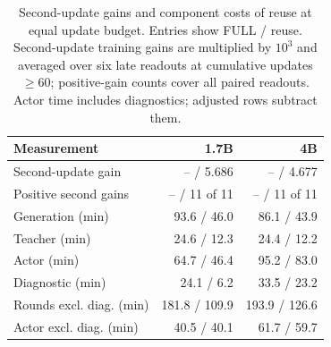 \begin{table}[!htbp]
\centering
\caption{Second-update gains and component costs of reuse at equal update budget. Entries show FULL / reuse. Second-update training gains are multiplied by $10^3$ and averaged over six late readouts at cumulative updates $\geq60$; positive-gain counts cover all paired readouts. Actor time includes diagnostics; adjusted rows subtract them.}
\label{tab:reuse_summary}
\small
\setlength{\tabcolsep}{3pt}
\begin{tabular}{lrr}
\toprule
Measurement & 1.7B & 4B \\
\midrule
Second-update gain & -- / 5.686 & -- / 4.677 \\
Positive second gains & -- / 11 of 11 & -- / 11 of 11 \\
\midrule
Generation (min) & 93.6 / 46.0 & 86.1 / 43.9 \\
Teacher (min) & 24.6 / 12.3 & 24.4 / 12.2 \\
Actor (min) & 64.7 / 46.4 & 95.2 / 83.0 \\
Diagnostic (min) & 24.1 / 6.2 & 33.5 / 23.2 \\
Rounds excl. diag. (min) & 181.8 / 109.9 & 193.9 / 126.6 \\
Actor excl. diag. (min) & 40.5 / 40.1 & 61.7 / 59.7 \\
\bottomrule
\end{tabular}
\end{table}
